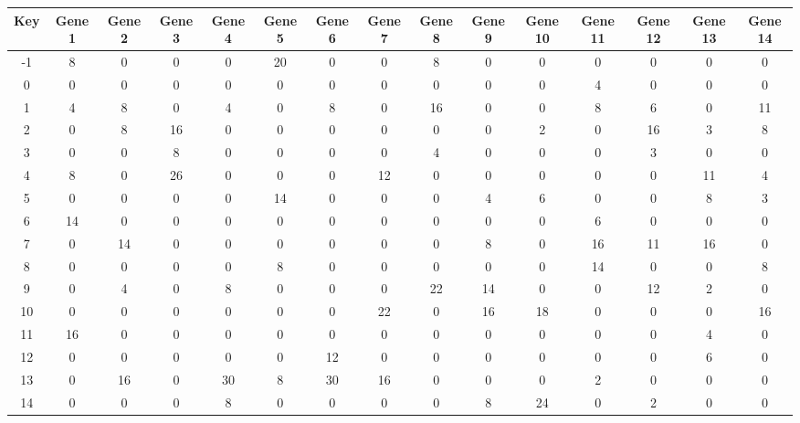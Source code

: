 \begin{tabular}{|c|c|c|c|c|c|c|c|c|c|c|c|c|c|c|}
\hline
Key & Gene 1 & Gene 2 & Gene 3 & Gene 4 & Gene 5 & Gene 6 & Gene 7 & Gene 8 & Gene 9 & Gene 10 & Gene 11 & Gene 12 & Gene 13 & Gene 14 \\
\hline
-1 & 8 & 0 & 0 & 0 & 20 & 0 & 0 & 8 & 0 & 0 & 0 & 0 & 0 & 0 \\
0 & 0 & 0 & 0 & 0 & 0 & 0 & 0 & 0 & 0 & 0 & 4 & 0 & 0 & 0 \\
1 & 4 & 8 & 0 & 4 & 0 & 8 & 0 & 16 & 0 & 0 & 8 & 6 & 0 & 11 \\
2 & 0 & 8 & 16 & 0 & 0 & 0 & 0 & 0 & 0 & 2 & 0 & 16 & 3 & 8 \\
3 & 0 & 0 & 8 & 0 & 0 & 0 & 0 & 4 & 0 & 0 & 0 & 3 & 0 & 0 \\
4 & 8 & 0 & 26 & 0 & 0 & 0 & 12 & 0 & 0 & 0 & 0 & 0 & 11 & 4 \\
5 & 0 & 0 & 0 & 0 & 14 & 0 & 0 & 0 & 4 & 6 & 0 & 0 & 8 & 3 \\
6 & 14 & 0 & 0 & 0 & 0 & 0 & 0 & 0 & 0 & 0 & 6 & 0 & 0 & 0 \\
7 & 0 & 14 & 0 & 0 & 0 & 0 & 0 & 0 & 8 & 0 & 16 & 11 & 16 & 0 \\
8 & 0 & 0 & 0 & 0 & 8 & 0 & 0 & 0 & 0 & 0 & 14 & 0 & 0 & 8 \\
9 & 0 & 4 & 0 & 8 & 0 & 0 & 0 & 22 & 14 & 0 & 0 & 12 & 2 & 0 \\
10 & 0 & 0 & 0 & 0 & 0 & 0 & 22 & 0 & 16 & 18 & 0 & 0 & 0 & 16 \\
11 & 16 & 0 & 0 & 0 & 0 & 0 & 0 & 0 & 0 & 0 & 0 & 0 & 4 & 0 \\
12 & 0 & 0 & 0 & 0 & 0 & 12 & 0 & 0 & 0 & 0 & 0 & 0 & 6 & 0 \\
13 & 0 & 16 & 0 & 30 & 8 & 30 & 16 & 0 & 0 & 0 & 2 & 0 & 0 & 0 \\
14 & 0 & 0 & 0 & 8 & 0 & 0 & 0 & 0 & 8 & 24 & 0 & 2 & 0 & 0 \\
\hline
\end{tabular}